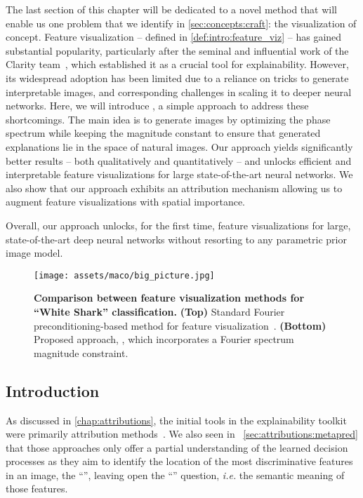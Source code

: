 

The last section of this chapter will be dedicated to a novel method that will enable us one problem that we identify in \autoref{sec:concepts:craft}: the visualization of concept. Feature visualization -- defined in \autoref{def:intro:feature_viz} -- has gained substantial popularity, particularly after the seminal and influential work of the Clarity team~\cite{olah2017feature}, which established it as a crucial tool for explainability.
However, its widespread adoption has been limited due to a reliance on tricks to generate interpretable images, and corresponding challenges in scaling it to deeper neural networks.
Here, we will introduce \magfv, a simple approach to address these shortcomings.
The main idea is to generate images by optimizing the phase spectrum while keeping the magnitude constant to ensure that generated explanations lie in the space of natural images. Our approach yields significantly better results -- both qualitatively and quantitatively -- and unlocks efficient and interpretable feature visualizations for large state-of-the-art neural networks.
We also show that our approach exhibits an attribution mechanism allowing us to augment feature visualizations with spatial importance.


Overall, our approach unlocks, for the first time, feature visualizations for large, state-of-the-art deep neural networks without resorting to any parametric prior image model.

\begin{figure}[ht]
\begin{center}
   \texttt{[image: assets/maco/big\_picture.jpg]}
\end{center}

\caption{\textbf{Comparison between feature visualization methods for ``White Shark'' classification.}
\textbf{(Top)} Standard Fourier preconditioning-based method for feature visualization~\cite{olah2017feature}.
\textbf{(Bottom)} Proposed approach, \magfv, which incorporates a Fourier spectrum magnitude constraint. %
}
\label{fig:maco:logits_fail}

\end{figure}

\subsection{Introduction}

As discussed in \autoref{chap:attributions}, the initial tools in the explainability toolkit were primarily attribution methods~\cite{simonyan2014deep,smilkov2017smoothgrad,selvaraju2017gradcam,fel2021sobol,novello2022making,sundararajan2017axiomatic,zeiler2014visualizing,shrikumar2017learning,Fong_2017,graziani2021sharpening}. We also seen in ~\autoref{sec:attributions:metapred} that those approaches only offer a partial understanding of the learned decision processes as they aim to identify the location of the most discriminative features in an image, the ``\where'', leaving open the ``\what'' question, \textit{i.e.} the semantic meaning of those features.


